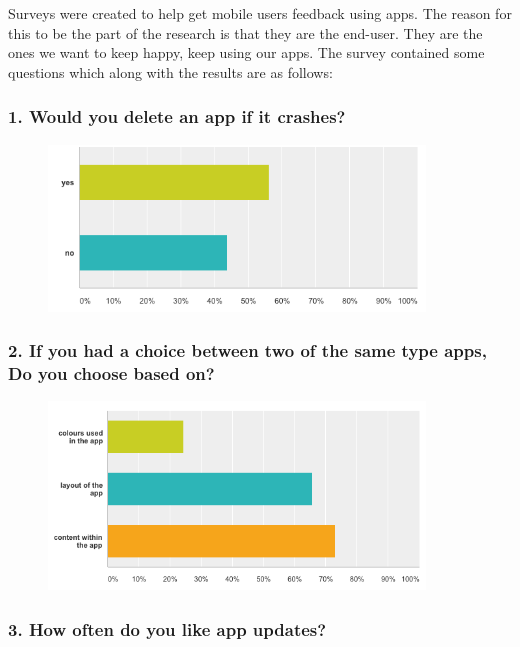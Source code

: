 Surveys were created to help get mobile users feedback using apps. The reason for this to be the part of the research is that they are the end-user. They are the ones we want to keep happy, keep using our apps. The survey contained some questions which along with the results are as follows:

\subsubsection{1. Would you delete an app if it crashes?}

\begin{figure}[!h]
    \centering
    \includegraphics[width=100mm]{images/survey/crashes}
    \label{fig:label}
\end{figure}

\subsubsection{2. If you had a choice between two of the same type apps, Do you choose based on?}

\begin{figure}[!h]
    \centering
    \includegraphics[width=100mm]{images/survey/choose}
    \label{fig:label}
\end{figure}

\subsubsection{3. How often do you like app updates?}


